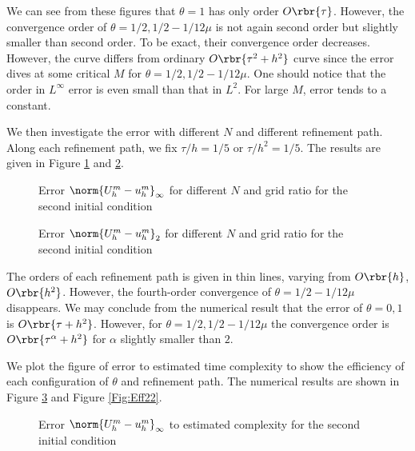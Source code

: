 \documentclass[english, nochinese]{pnote}
\begin{document}
We can see from these figures that $ \theta = 1 $ has only order $ O \rbr{\tau} $. However, the convergence order of $ \theta = 1 / 2, 1 / 2 - 1 / 12 \mu $ is not again second order but slightly smaller than second order. To be exact, their convergence order decreases. However, the curve differs from ordinary $ O \rbr{ \tau^2 + h^2 } $ curve since the error dives at some critical $M$ for $ \theta = 1 / 2, 1 / 2 - 1 / 12 \mu $. One should notice that the order in $L^{\infty}$ error is even small than that in $L^2$. For large $M$, error tends to a constant.

We then investigate the error with different $N$ and different refinement path. Along each refinement path, we fix $ \tau / h = 1 / 5 $ or $ \tau / h^2 = 1 / 5 $. The results are given in Figure \ref{Fig:ConvI2} and \ref{Fig:Conv22}. 

\begin{figure}
\centering
\scalebox{0.75}{}
\caption{Error $ \norm{ U_h^m - u_h^m }_{\infty} $ for different $N$ and grid ratio for the second initial condition}
\label{Fig:ConvI2}
\end{figure}

\begin{figure}
\centering
\scalebox{0.75}{}
\caption{Error $ \norm{ U_h^m - u_h^m }_2 $ for different $N$ and grid ratio for the second initial condition}
\label{Fig:Conv22}
\end{figure}

The orders of each refinement path is given in thin lines, varying from $ O \rbr{h} $, $ O \rbr{h^2} $. However, the fourth-order convergence of $ \theta = 1 / 2 - 1 / 12 \mu $ disappears. We may conclude from the numerical result that the error of $ \theta = 0, 1 $ is $ O \rbr{ \tau + h^2 } $. However, for $ \theta = 1 / 2, 1 / 2 - 1 / 12 \mu $ the convergence order is $ O \rbr{ \tau^{\alpha} + h^2 } $ for $\alpha$ slightly smaller than $2$.

We plot the figure of error to estimated time complexity to show the efficiency of each configuration of $\theta$ and refinement path. The numerical results are shown in Figure \ref{Fig:EffI2} and Figure \ref{Fig:Eff22}. 

\begin{figure}
\centering
\scalebox{0.75}{}
\caption{Error $ \norm{ U_h^m - u_h^m }_{\infty} $ to estimated complexity for the second initial condition}
\label{Fig:EffI2}
\end{figure}
\end{document}
